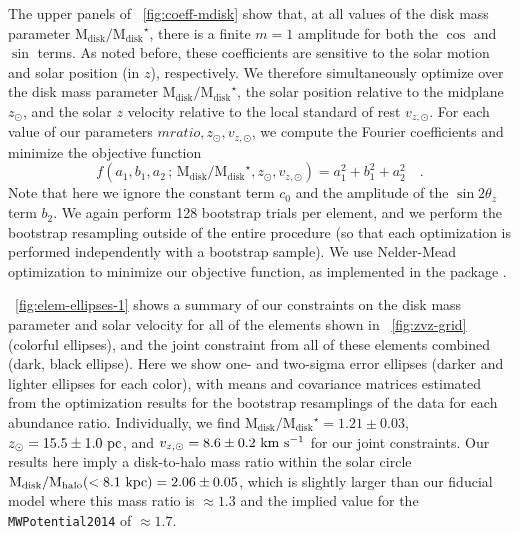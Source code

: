 \documentclass[modern]{aastex63}
\newcommand{\mdisk}{\ensuremath{\mathrm{M}_\mathrm{disk}}}
\newcommand{\mratio}{\ensuremath{\mdisk / \mdisk^\star}}
\begin{document}
The upper panels of \figurename~\ref{fig:coeff-mdisk} show that, at all values
of the disk mass parameter \mratio, there is a finite $m=1$ amplitude for both
the $\cos$ and $\sin$ terms.
As noted before, these coefficients are sensitive to the solar motion and solar
position (in $z$), respectively.
We therefore simultaneously optimize over the disk mass parameter \mratio, the
solar position relative to the midplane $z_\odot$, and the solar $z$ velocity
relative to the local standard of rest $v_{z, \odot}$.
For each value of our parameters $mratio, z_\odot, v_{z, \odot}$, we compute the
Fourier coefficients and minimize the objective function
\begin{equation}
  f(a_1, b_1, a_2 \,;\, \mratio, z_\odot, v_{z, \odot}) =
    a_1^2 + b_1^2 + a_2^2 \quad . \label{eq:objective}
\end{equation}
Note that here we ignore the constant term $c_0$ and the amplitude of the $\sin
2\theta_z$ term $b_2$.
We again perform 128 bootstrap trials per element, and we perform the bootstrap
resampling outside of the entire procedure (so that each optimization is
performed independently with a bootstrap sample).
We use Nelder-Mead optimization \citep{Gao:2012} to minimize our objective
function, as implemented in the  package \citep{scipy}.

\figurename~\ref{fig:elem-ellipses-1} shows a summary of our constraints on the
disk mass parameter and solar velocity for all of the elements shown in
\figurename~\ref{fig:zvz-grid} (colorful ellipses), and the joint constraint
from all of these elements combined (dark, black ellipse).
Here we show one- and two-sigma error ellipses (darker and lighter ellipses for
each color), with means and covariance matrices estimated from the optimization
results for the bootstrap resamplings of the data for each abundance ratio.
Individually, we find $\mratio = 1.21 \pm 0.03$, $z_\odot = 15.5 \pm 1.0~\mathrm{pc}$,
and $v_{z, \odot} = 8.6 \pm 0.2~\mathrm{km}~\mathrm{s}^{-1}$ for our joint constraints.
Our results here imply a disk-to-halo mass ratio within the solar circle ${\rm
M}_{\rm disk} / {\rm M}_{\rm halo} (<8.1~\mathrm{kpc}) = 2.06 \pm 0.05$, which is
slightly larger than our fiducial model where this mass ratio is $\approx 1.3$
\citep{gala} and the implied value for the \texttt{MWPotential2014}
\citep{Bovy:2015} of $\approx 1.7$.
\end{document}
